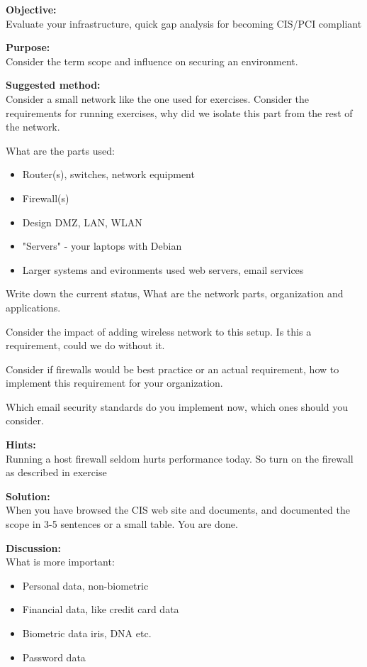 \documentclass[a4paper,11pt,notitlepage]{report}
\begin{document}
{\bf Objective:}\\
Evaluate your infrastructure, quick gap analysis for becoming CIS/PCI compliant

{\bf Purpose:}\\
Consider the term scope and influence on securing an environment.

{\bf Suggested method:}\\
Consider a small network like the one used for exercises. Consider the requirements for running exercises, why did we isolate this part from the rest of the network.

What are the parts used:
\begin{itemize}
\item Router(s), switches, network equipment
\item Firewall(s)
\item Design DMZ, LAN, WLAN
\item "Servers" - your laptops with Debian
\item Larger systems and evironments used web servers, email services
\end{itemize}

Write down the current status, What are the network parts, organization and applications.

Consider the impact of adding wireless network to this setup. Is this a requirement, could we do without it.

Consider if firewalls would be best practice or an actual requirement, how to implement this requirement for your organization.

Which email security standards do you implement now, which ones should you consider.

{\bf Hints:}\\
Running a host firewall seldom hurts performance today. So turn on the firewall as described in exercise 

{\bf Solution:}\\
When you have browsed the CIS web site and documents, and documented the scope in 3-5 sentences or a small table. You are done.

{\bf Discussion:}\\

What is more important:

\begin{itemize}
\item Personal data, non-biometric
\item Financial data, like credit card data
\item Biometric data iris, DNA etc.
\item Password data
\end{itemize}
\end{document}
